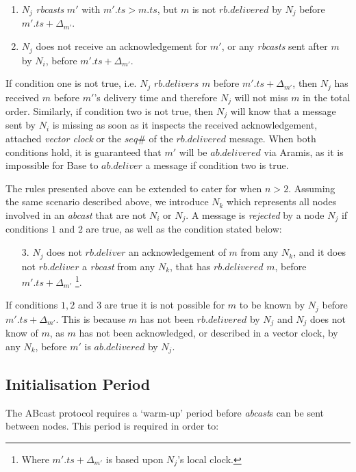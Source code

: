         \begin{enumerate}
            \item    $N_j$ \emph{rbcasts} $m'$ with $m'.ts > m.ts$, but $m$ is not $rb.delivered$ by $N_j$ before $m'.ts + \Delta_{m'}$.
            
            \item    $N_j$ does not receive an acknowledgement for $m'$, or any \emph{rbcasts} sent after $m$ by $N_i$, before $m'.ts + \Delta_{m'}$.  
        \end{enumerate}
        
        If condition one is not true, i.e. $N_j$ $rb.delivers$ $m$ before $m'.ts + \Delta_{m'}$, then $N_j$ has received $m$ before $m'$'s delivery time and therefore $N_j$ will not miss $m$ in the total order.  Similarly, if condition two is not true, then $N_j$ will know that a message sent by $N_i$ is missing as soon as it inspects the received acknowledgement, attached \emph{vector clock} or the $seq\#$ of the $rb.delivered$ message.  When both conditions hold, it is guaranteed that $m'$ will be $ab.delivered$ via \textsf{Aramis}, as it is impossible for \textsf{Base} to $ab.deliver$ a message if condition two is true.  
        
        The rules presented above can be extended to cater for when $n > 2$.  Assuming the same scenario described above, we introduce $N_k$ which represents all nodes involved in an \emph{abcast} that are not $N_i$ or $N_j$.  A message is \emph{rejected} by a node $N_j$ if conditions $1$ and $2$ are true, as well as the condition stated below:
        
         \begin{itemize}
            \item[3.] $N_j$ does not $rb.deliver$ an acknowledgement of $m$ from any $N_k$, and it does not $rb.deliver$ a \emph{rbcast} from any $N_k$, that has $rb.delivered$ $m$, before $m'.ts + \Delta_{m'}$ \footnote{Where $m'.ts + \Delta_{m'}$ is based upon $N_j$'s local clock.}.  
        \end{itemize}
        
        If conditions $1,2$ and $3$ are true it is not possible for $m$ to be known by $N_j$ before $m'.ts + \Delta_{m'}$.  This is because $m$ has not been $rb.delivered$ by $N_j$ and $N_j$ does not know of $m$, as $m$ has not been acknowledged, or described in a vector clock, by any $N_k$, before $m'$ is $ab.delivered$ by $N_j$.  
        
        
    \subsection{Initialisation Period}
     The \textsf{ABcast} protocol requires a \textquoteleft{}warm-up' period before \emph{abcast}s can be sent between nodes.  This period is required in order to: 
    
